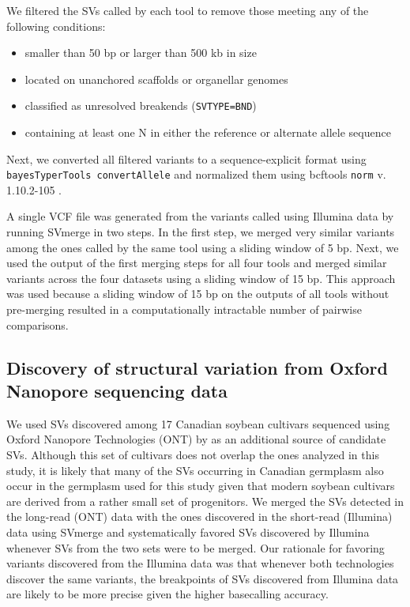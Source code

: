 We filtered the SVs called by each tool to remove those meeting any of the following conditions:

\begin{itemize}
	\item smaller than 50 bp or larger than 500 kb in size
	\item located on unanchored scaffolds or organellar genomes
	\item classified as unresolved breakends (\texttt{SVTYPE=BND})
	\item containing at least one N in either the reference or alternate allele sequence
\end{itemize}

Next, we converted all filtered variants to a sequence-explicit format using
\texttt{bayesTyperTools convertAllele} \citep{sibbesen2018} and normalized them
using bcftools \texttt{norm} v. 1.10.2-105 \citep{li2009-samtools}.

A single VCF file was generated from the variants called using Illumina data by
running SVmerge \citep{wong2010} in two steps. In the first step, we merged
very similar variants among the ones called by the same tool using a
sliding window of 5 bp. Next, we used the output of the first merging steps
for all four tools and merged similar variants across the four datasets using
a sliding window of 15 bp. This approach was used because a
sliding window of 15 bp on the outputs of all tools without pre-merging
resulted in a computationally intractable number of pairwise comparisons.

\subsection*{Discovery of structural variation from Oxford Nanopore sequencing data}
\label{sv-gwas-sv-discovery-ont}

We used SVs discovered among 17 Canadian soybean cultivars sequenced using
Oxford Nano\-pore Technologies (ONT) by \cite{lemay2022} as an additional
source of candidate SVs. Although this set of cultivars does not overlap the
ones analyzed in this study, it is likely that many of the SVs occurring
in Canadian germplasm also occur in the germplasm used for this study given that modern soybean
cultivars are derived from a rather small set of progenitors. We merged the SVs detected in the
long-read (ONT) data with the ones discovered in the short-read (Illumina) data
using SVmerge and systematically favored SVs discovered by Illumina whenever
SVs from the two sets were to be merged.  Our rationale for favoring variants
discovered from the Illumina data was that whenever both technologies discover
the same variants, the breakpoints of SVs discovered from Illumina data are
likely to be more precise given the higher basecalling accuracy.

